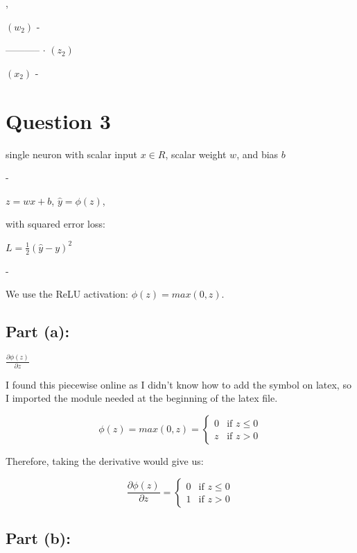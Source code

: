 \documentclass{article}
\begin{document}
,

$(w_2)$ -

----------- $\cdot$ $(z_2)$

$(x_2)$ -


\section*{Question 3}

single neuron with scalar input $x \in R$, scalar weight $w$, and bias $b$

-

$z = wx + b$, $\hat{y} = \phi (z)$,

with squared error loss:

$L = \frac{1}{2}(\hat{y} - y)^2$

-

We use the ReLU activation: $\phi (z) = max(0, z)$.

\subsection*{Part (a):}

\begin{center}
$\frac{\partial \phi (z)}{\partial z}$
\end{center}

I found this piecewise online as I didn't know how to add the symbol on latex, so I imported the module needed at the beginning of the latex file.

\begin{equation}
\phi(z) = max(0, z) = 
\begin{cases}
0 & \text{if } z  \le 0 \\
z & \text{if } z > 0
\end{cases}
\end{equation}

Therefore, taking the derivative would give us:

\begin{equation}
\frac{\partial \phi (z)}{\partial z} = 
\begin{cases}
0 & \text{if } z  \le 0 \\
1 & \text{if } z > 0
\end{cases}
\end{equation}

\subsection*{Part (b):}
\end{document}
